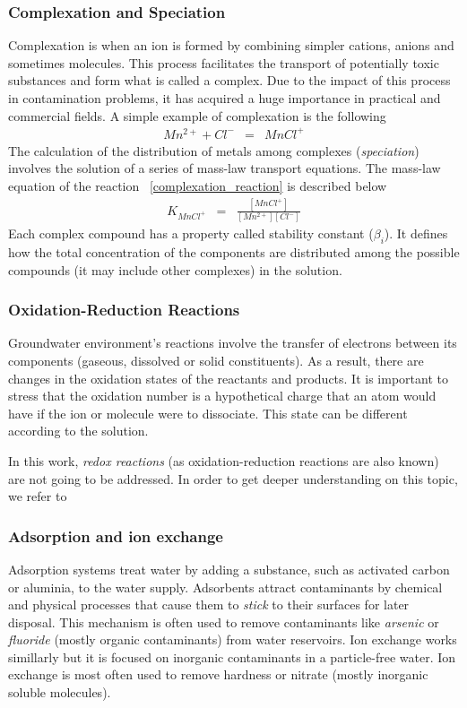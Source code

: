 \subsubsection{Complexation and Speciation}
Complexation is when an ion is formed by combining simpler cations, anions and sometimes molecules. This process facilitates the transport of potentially toxic substances and form what is called a complex. Due to the impact of this process in contamination problems, it has acquired a huge importance in practical and commercial fields. A simple example of complexation is the following
\begin{eqnarray}\label{complexation_reaction}
Mn^{2+} + Cl^- &=& MnCl^+
\end{eqnarray}
The calculation of the distribution of metals among complexes (\emph{speciation}) involves the solution of a series of mass-law transport equations. The mass-law equation of the reaction ~\ref{complexation_reaction} is described below
\begin{eqnarray}
K_{MnCl^+} &=& \frac{[MnCl^+]}{[Mn^{2+}][Cl^-]}
\end{eqnarray}
Each complex compound has a property called stability constant ($\beta_i$). It defines how the total concentration of the components are distributed among the possible compounds (it may include other complexes) in the solution.

\subsubsection{Oxidation-Reduction Reactions}
Groundwater environment's reactions involve the transfer of electrons between its components (gaseous, dissolved or solid constituents). As a result, there are changes in the oxidation states of the reactants and products. It is important to stress that the oxidation number is a hypothetical charge that an atom would have if the ion or molecule were to dissociate. This state can be different according to the solution. 

In this work, \emph{redox reactions} (as oxidation-reduction reactions are also known) are not going to be addressed. In order to get deeper understanding on this topic, we refer to \cite{Petrucci:07}

\subsubsection{Adsorption and ion exchange}
Adsorption systems treat water by adding a substance, such as activated carbon or aluminia, to the water supply. Adsorbents attract contaminants by chemical and physical processes that cause them to \emph{stick} to their surfaces for later disposal. This mechanism is often used to remove contaminants like \emph{arsenic} or \emph{fluoride} (mostly organic contaminants) from water reservoirs. Ion exchange works simillarly but it is focused on inorganic contaminants in a particle-free water. Ion exchange is most often used to remove hardness or nitrate (mostly inorganic soluble molecules). 

